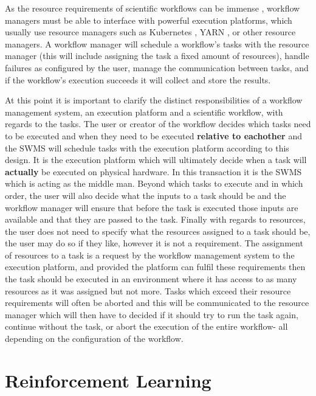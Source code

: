 As the resource requirements of scientific workflows can be immense \cite{resource_provisioning}, workflow managers must be able to interface with powerful execution platforms, which usually use resource managers such as Kubernetes \cite{kubernetes}, YARN \cite{yarn}, or other resource managers. A workflow manager will schedule a workflow’s tasks with the resource manager (this will include assigning the task a fixed amount of resources), handle failures as configured by the user, manage the communication between tasks, and if the workflow’s execution succeeds it will collect and store the results.

At this point it is important to clarify the distinct responsibilities of a workflow management system, an execution platform and a scientific workflow, with regards to the tasks. The user or creator of the workflow decides which tasks need to be executed and when they need to be executed \textbf{relative to eachother} and the SWMS will schedule tasks with the execution platform according to this design. It is the execution platform which will ultimately decide when a task will \textbf{actually} be executed on physical hardware. In this transaction it is the SWMS which is acting as the middle man. 
Beyond which tasks to execute and in which order, the user will also decide what the inputs to a task should be and the workflow manager will ensure that before the task is executed those inputs are available and that they are passed to the task. Finally with regards to resources, the user does not need to specify what the resources assigned to a task should be, the user may do so if they like, however it is not a requirement. The assignment of resources to a task is a request by the workflow management system to the execution platform, and provided the platform can fulfil these requirements then the task should be executed in an environment where it has access to as many resources as it was assigned but not more. Tasks which exceed their resource requirements will often be aborted and this will be communicated to the resource manager which will then have to decided if it should try to run the task again, continue without the task, or abort the execution of the entire workflow- all depending on the configuration of the workflow.

\section{Reinforcement Learning}
\label{sec:rl}

